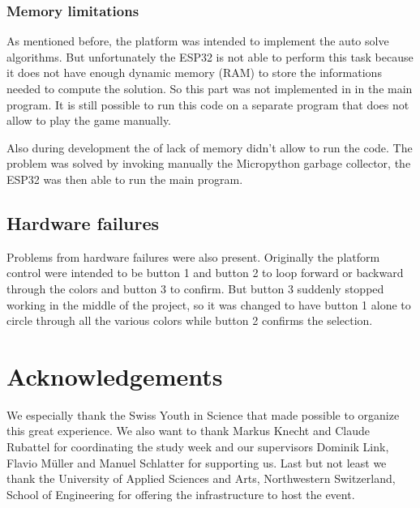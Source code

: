 \documentclass[a4paper, 12pt]{article}
\begin{document}
\subsubsection{Memory limitations}
As mentioned before, the platform was intended to implement the auto
solve algorithms. But unfortunately the ESP32 is not able to perform
this task because it does not have enough dynamic memory (RAM) to store
the informations needed to compute the solution. So this part was not
implemented in in the main program. It is still possible to run this
code on a separate program that does not allow to play the game
manually.

Also during development the of lack of memory didn’t allow to run the
code. The problem was solved by invoking manually the Micropython
garbage collector, the ESP32 was then able to run the main program.

\subsection{Hardware failures}
Problems from hardware failures were also present. Originally the
platform control were intended to be button 1 and button 2 to loop
forward or backward through the colors and button 3 to confirm. But
button 3 suddenly stopped working in the middle of the project, so it
was changed to have button 1 alone to circle through all the various
colors while button 2 confirms the selection.

\section{Acknowledgements}
We especially thank the Swiss Youth in Science that made possible to
organize this great experience. We also want to thank Markus Knecht and
Claude Rubattel for coordinating the study week and our supervisors
Dominik Link, Flavio Müller and Manuel Schlatter for supporting us. Last
but not least we thank the University of Applied Sciences and Arts,
Northwestern Switzerland, School of Engineering for offering the
infrastructure to host the event.
\end{document}
